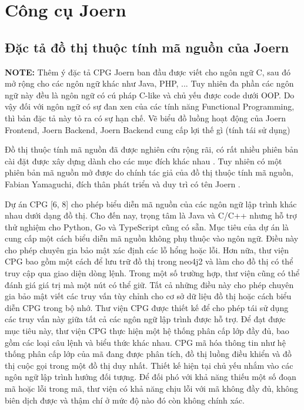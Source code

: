 \section{Công cụ Joern}

\subsection{Đặc tả đồ thị thuộc tính mã nguồn của Joern}

\textbf{NOTE:} Thêm ý đặc tả CPG Joern ban đầu được viết cho ngôn ngữ C, sau đó mở rộng cho các ngôn ngữ khác như Java, PHP, ... Tuy nhiên đa phần các ngôn ngữ này đều là ngôn ngữ có cú pháp C-like và chủ yếu được code dưới OOP. Do vậy đối với ngôn ngữ có sự đan xen của các tính năng Functional Programming, thì bản đặc tả này tỏ ra có sự hạn chế. Vẽ biểu đồ luồng hoạt động của Joern Frontend, Joern Backend, Joern Backend cung cấp lợi thế gì (tính tái sử dụng)

Đồ thị thuộc tính mã nguồn đã được nghiên cứu rộng rãi, có rất nhiều phiên bản cài đặt được xây dựng dành cho các mục đích khác nhau \cite{yamaguchi2014modeling, xiaomeng2018cpgva, kuchler2022representing, githubGitHubWimkeirgraft, githubGitHubPlumeossplume, joernJoernHunteraposs, fraunhoferaisecHomeCode, banse2021cloud, weiss2022language, keirsgieter2020graft}.
Tuy nhiên có một phiên bản mã nguồn mở được do chính tác giả của đồ thị thuộc tính mã nguồn, Fabian Yamaguchi, đích thân phát triển và duy trì có tên Joern \cite{joernJoernHunteraposs}.

Dự án CPG [6, 8] cho phép biểu diễn mã nguồn của các ngôn ngữ lập trình khác nhau dưới dạng đồ thị.
Cho đến nay, trọng tâm là Java và C/C++ nhưng hỗ trợ thử nghiệm cho Python, Go và TypeScript cũng có sẵn.
Mục tiêu của dự án là cung cấp một cách biểu diễn mã nguồn không phụ thuộc vào ngôn ngữ.
Điều này cho phép chuyên gia bảo mật xác định các lỗ hổng hoặc lỗi.
Hơn nữa, thư viện CPG bao gồm một cách để lưu trữ đồ thị trong neo4j2 và làm cho đồ thị có thể truy cập qua giao diện dòng lệnh.
Trong một số trường hợp, thư viện cũng có thể đánh giá giá trị mà một nút có thể giữ.
Tất cả những điều này cho phép chuyên gia bảo mật viết các truy vấn tùy chỉnh cho cơ sở dữ liệu đồ thị hoặc cách biểu diễn CPG trong bộ nhớ.
Thư viện CPG được thiết kế để cho phép tái sử dụng các truy vấn này giữa tất cả các ngôn ngữ lập trình được hỗ trợ.
Để đạt được mục tiêu này, thư viện CPG thực hiện một hệ thống phân cấp lớp đầy đủ, bao gồm các loại câu lệnh và biểu thức khác nhau.
CPG mã hóa thông tin như hệ thống phân cấp lớp của mã đang được phân tích, đồ thị luồng điều khiển và đồ thị cuộc gọi trong một đồ thị duy nhất.
Thiết kế hiện tại chủ yếu nhắm vào các ngôn ngữ lập trình hướng đối tượng.
Để đối phó với khả năng thiếu một số đoạn mã hoặc lỗi trong mã, thư viện có khả năng chịu lỗi với mã không đầy đủ, không biên dịch được và thậm chí ở mức độ nào đó còn không chính xác.

